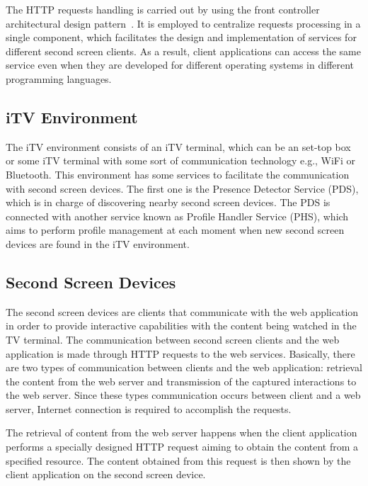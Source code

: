 \documentclass[journal]{IEEEtran}
\begin{document}
The HTTP requests handling is carried out by using the front controller architectural design pattern~\cite{Buschmann2007}. It is employed to centralize requests processing in a single component, which facilitates the design and implementation of services for different second screen clients. As a result, client applications can access the same service even when they are developed for different operating systems in different programming languages.

\subsection{iTV Environment}

The iTV environment consists of an iTV terminal, which can be an set-top box or some iTV terminal with some sort of communication technology e.g., WiFi or Bluetooth. This environment has some services to facilitate the communication with second screen devices. The first one is the Presence Detector Service (PDS), which is in charge of discovering nearby second screen devices. The PDS is connected with another service known as Profile Handler Service (PHS), which aims to perform profile management at each moment when new second screen devices are found in the iTV environment.


\subsection{Second Screen Devices}

The second screen devices are clients that communicate with the web application in order to provide interactive capabilities with the content being watched in the TV terminal. The communication between second screen clients and the web application is made through HTTP requests to the web services. Basically, there are two types of communication between clients and the web application: retrieval the content from the web server and transmission of the captured interactions to the web server. Since these types communication occurs between client and a web server, Internet connection is required to accomplish the requests.

The retrieval of content from the web server happens when the client application performs a specially designed HTTP request aiming to obtain the content from a specified resource. The content obtained from this request is then shown by the client application on the second screen device.
\end{document}
